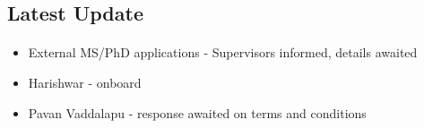 \documentclass[aspectratio=169]{beamer}
\begin{document}
\subsection{Latest Update}
\begin{frame}[fragile=singleslide]{\insertsectionhead}
\framesubtitle{\insertsubsectionhead}
\begin{center}
\begin {itemize}
\item External MS/PhD applications - Supervisors informed, details awaited
\item Harishwar - onboard
\item Pavan Vaddalapu - response awaited on terms and conditions
\end{itemize}
\end{center}
\end{frame}
\end{document}
